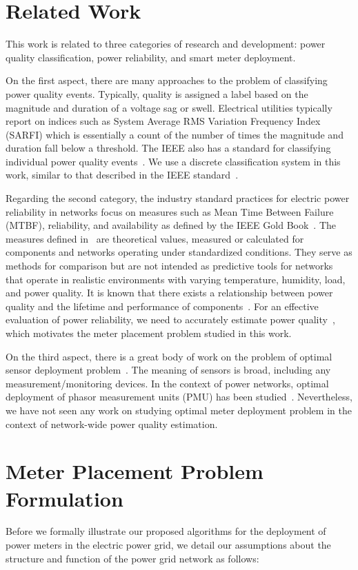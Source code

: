 \section{Related Work}
\label{relatedwork}
This work is related to three categories of research and development: power quality classification, power reliability, and smart meter deployment. 

On the first aspect, there are many approaches to the problem of classifying power quality events. Typically, quality is assigned a label based on the magnitude and duration of a voltage sag or swell.  Electrical utilities typically report on indices such as System Average RMS Variation Frequency Index (SARFI) which is essentially a count of the number of times the magnitude and duration fall below a threshold. The IEEE also has a standard for classifying individual power quality events~\cite{IEEE09_1159}. We use a discrete classification system in this work, similar to that described in the IEEE standard~\cite{IEEE09_1159}. 

Regarding the second category, the industry standard practices for electric power reliability in networks focus on measures such as Mean Time Between Failure (MTBF), reliability, and availability as defined by the IEEE Gold Book~\cite{goldbook}. The measures defined in~\cite{goldbook} are theoretical values, measured or calculated for components and networks operating under standardized conditions. They serve as methods for comparison but are not intended as predictive tools for networks that operate in realistic environments with varying temperature, humidity, load, and power quality. It is known that there exists a relationship between power quality and the lifetime and performance of components~\cite{iti_curve}. For an effective evaluation of power reliability, we need to accurately estimate power quality~\cite{catherine_pri}, which motivates the meter placement problem studied in this work.

On the third aspect, there is a great body of work on the problem of optimal sensor deployment problem~\cite{Krause09}. The meaning of sensors is broad, including any measurement/monitoring devices. In the context of power networks, optimal deployment of phasor measurement units (PMU) has been studied~\cite{Yuill11}. Nevertheless, we have not seen any work on studying optimal meter deployment problem in the context of network-wide power quality estimation.

\section{Meter Placement Problem Formulation}
Before we formally illustrate our proposed algorithms for the deployment of power meters in the electric power grid, we detail our assumptions about the structure and function of the power grid network as follows:

